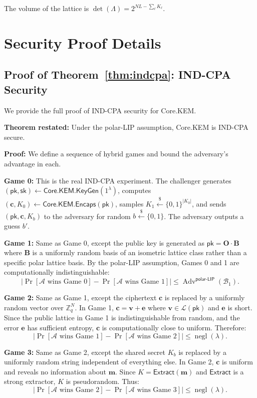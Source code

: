 \documentclass[11pt,a4paper]{article}
\newcommand{\CoreKEM}{\textsf{Core.KEM}\xspace}
\newcommand{\Extract}{\textsf{Extract}\xspace}
\newcommand{\polarLIP}{\textsf{polar-LIP}\xspace}
\newcommand{\INDCPA}{\textsf{IND-CPA}\xspace}
\newcommand{\bit}{\{0,1\}}
\newcommand{\Z}{\mathbb{Z}}
\DeclareMathOperator{\negl}{negl}
\newcommand{\sample}{\xleftarrow{\$}}
\DeclareMathOperator{\Adv}{Adv}
\newcommand{\pk}{\mathsf{pk}}
\newcommand{\sk}{\mathsf{sk}}
\begin{document}
The volume of the lattice is $\det(\Lambda) = 2^{NL - \sum_\ell K_\ell}$.

\section{Security Proof Details}\label{app:proofs}

\subsection{Proof of Theorem~\ref{thm:indcpa}: IND-CPA Security}\label{app:indcpa-proof}

We provide the full proof of \INDCPA security for \CoreKEM.

\textbf{Theorem restated:} Under the \polarLIP assumption, \CoreKEM is \INDCPA secure.

\textbf{Proof:} We define a sequence of hybrid games and bound the adversary's advantage in each.

\textbf{Game 0:} This is the real \INDCPA experiment. The challenger generates $(\pk, \sk) \gets \CoreKEM.\mathsf{KeyGen}(1^\lambda)$, computes $(\mathbf{c}, K_0) \gets \CoreKEM.\mathsf{Encaps}(\pk)$, samples $K_1 \sample \bit^{|K_0|}$, and sends $(\pk, \mathbf{c}, K_b)$ to the adversary for random $b \sample \{0,1\}$. The adversary outputs a guess $b'$.

\textbf{Game 1:} Same as Game 0, except the public key is generated as $\pk = \mathbf{O} \cdot \mathbf{B}$ where $\mathbf{B}$ is a uniformly random basis of an isometric lattice class rather than a specific polar lattice basis. By the \polarLIP assumption, Games 0 and 1 are computationally indistinguishable:
\[
|\Pr[\mathcal{A} \text{ wins Game 0}] - \Pr[\mathcal{A} \text{ wins Game 1}]| \leq \Adv^{\polarLIP}(\mathcal{B}_1).
\]

\textbf{Game 2:} Same as Game 1, except the ciphertext $\mathbf{c}$ is replaced by a uniformly random vector over $\Z_q^N$. In Game 1, $\mathbf{c} = \mathbf{v} + \mathbf{e}$ where $\mathbf{v} \in \mathcal{L}(\pk)$ and $\mathbf{e}$ is short. Since the public lattice in Game 1 is indistinguishable from random, and the error $\mathbf{e}$ has sufficient entropy, $\mathbf{c}$ is computationally close to uniform. Therefore:
\[
|\Pr[\mathcal{A} \text{ wins Game 1}] - \Pr[\mathcal{A} \text{ wins Game 2}]| \leq \negl(\lambda).
\]

\textbf{Game 3:} Same as Game 2, except the shared secret $K_b$ is replaced by a uniformly random string independent of everything else. In Game 2, $\mathbf{c}$ is uniform and reveals no information about $\mathbf{m}$. Since $K = \Extract(\mathbf{m})$ and $\Extract$ is a strong extractor, $K$ is pseudorandom. Thus:
\[
|\Pr[\mathcal{A} \text{ wins Game 2}] - \Pr[\mathcal{A} \text{ wins Game 3}]| \leq \negl(\lambda).
\]
\end{document}
